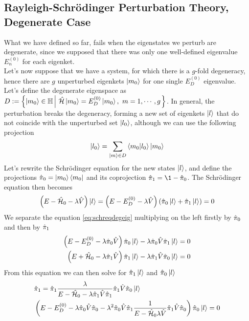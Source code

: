 \documentclass[../qm.tex]{subfiles}
\begin{document}
	\subsection{Rayleigh-Schrödinger Perturbation Theory, Degenerate Case}
	What we have defined so far, fails when the eigenstates we perturb are degenerate, since we supposed that there was only one well-defined eigenvalue $E_n^{(0)}$ for each eigenket.\\
	Let's now suppose that we have a system, for which there is a $g$-fold degeneracy, hence there are $g$ unperturbed eigenkets $\ket{m_0}$ for one single $E_D^{(0)}$ eigenvalue. Let's define the degenerate eigenspace as $D:=\left\{\ket{m_0}\in\hilbert\left|\ \opr{\ham}\ket{m_0}=E_D^{(0)}\ket{m_0},\ m=1,\cdots,g\right.\right\}$. In general, the perturbation breaks the degeneracy, forming a new set of eigenkets $\ket{l}$ that do not coincide with the unperturbed set $\ket{l_0}$, although we can use the following projection
	\begin{equation*}
		\ket{l_0}=\sum_{\ket{m}\in D}\bra{m_0}\ket{l_0}\ket{m_0}
	\end{equation*}
	Let's rewrite the Schrödinger equation for the new states $\ket{l}$, and define the projections $\hat{\pi}_0=\ket{m_0}\bra{m_0}$ and its coprojection $\opr{\pi}_1=\1-\opr{\pi}_0$. The Schrödinger equation then becomes
	\begin{equation}
		\left( E-\hat{\mathcal{H}}_0-\lambda\hat{V} \right)\ket{l}=\left( E-E_D^{(0)}-\lambda\hat{V} \right)\left( \hat{\pi}_0\ket{l}+\hat{\pi}_1\ket{l} \right)=0
		\label{eq:schreqdegeig}
	\end{equation}
	We separate the equation \eqref{eq:schreqdegeig} multiplying on the left firstly by $\hat{\pi}_0$ and then by $\hat{\pi}_1$
	\begin{equation}
		\begin{aligned}
			\left( E-E_D^{(0)}-\lambda\hat{\pi}_0\hat{V} \right)\hat{\pi}_0\ket{l}-\lambda\hat{\pi}_0\hat{V}\hat{\pi}_1\ket{l}&=0\\
			\left( E+\hat{\mathcal{H}}_0-\lambda\hat{\pi}_1\hat{V} \right)\hat{\pi}_1\ket{l}-\lambda\hat{\pi}_1\hat{V}\hat{\pi}_0\ket{l}&=0
		\end{aligned}
		\label{eq:newschreqdegeig}
	\end{equation}
	From this equation we can then solve for $\hat{\pi}_1\ket{l}$ and $\hat{\pi}_0\ket{l}$
	\begin{equation}
		\begin{aligned}
			&\hat{\pi}_1=\hat{\pi}_1\frac{\lambda}{E-\hat{\mathcal{H}}_0-\lambda\hat{\pi}_1\hat{V}\hat{\pi}_1}\hat{\pi}_1\hat{V}\hat{\pi}_0\ket{l}\\
			&\left( E-E_D^{(0)}-\lambda\hat{\pi}_0\hat{V}\hat{\pi}_0-\lambda^2\hat{\pi}_0\hat{V}\hat{\pi}_1\frac{1}{E-\hat{\mathcal{H}}_0\lambda\hat{V}}\hat{\pi}_1\hat{V}\hat{\pi}_0 \right)\hat{\pi}_0\ket{l}=0
		\end{aligned}
		\label{eq:projsoldegschr}
	\end{equation}
\end{document}

